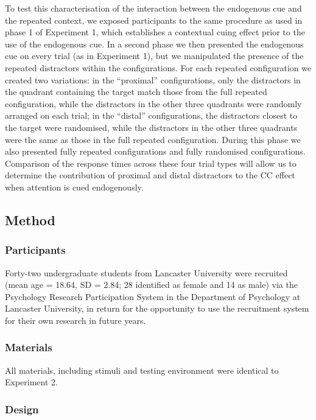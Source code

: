 \documentclass[
  man,
  floatsintext,
  longtable,
  nolmodern,
  notxfonts,
  notimes,
  colorlinks=true,linkcolor=blue,citecolor=blue,urlcolor=blue]{apa7}
\begin{document}
To test this characterisation of the interaction between the endogenous
cue and the repeated context, we exposed participants to the same
procedure as used in phase 1 of Experiment 1, which establishes a
contextual cuing effect prior to the use of the endogenous cue. In a
second phase we then presented the endogenous cue on every trial (as in
Experiment 1), but we manipulated the presence of the repeated
distractors within the configurations. For each repeated configuration
we created two variations: in the ``proximal'' configurations, only the
distractors in the quadrant containing the target match those from the
full repeated configuration, while the distractors in the other three
quadrants were randomly arranged on each trial; in the ``distal''
configurations, the distractors closest to the target were randomised,
while the distractors in the other three quadrants were the same as
those in the full repeated configuration. During this phase we also
presented fully repeated configurations and fully randomised
configurations. Comparison of the response times across these four trial
types will allow us to determine the contribution of proximal and distal
distractors to the CC effect when attention is cued endogenously.

\subsection{Method}\label{method-2}

\subsubsection{Participants}\label{participants-2}

Forty-two undergraduate students from Lancaster University were
recruited (mean age = 18.64, SD = 2.84; 28 identified as female and 14
as male) via the Psychology Research Participation System in the
Department of Psychology at Lancaster University, in return for the
opportunity to use the recruitment system for their own research in
future years.

\subsubsection{Materials}\label{materials-2}

All materials, including stimuli and testing environment were identical
to Experiment 2.

\subsubsection{Design}\label{design-2}
\end{document}
